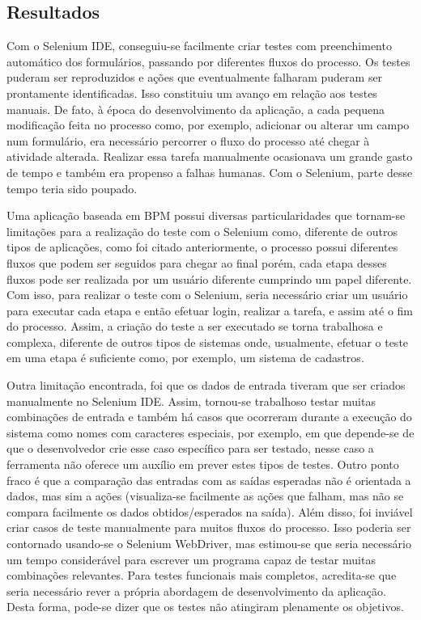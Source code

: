 \documentclass[12pt]{article}
\begin{document}
\subsection{Resultados}

Com o Selenium IDE, conseguiu-se facilmente criar testes com preenchimento automático dos formulários, passando por diferentes fluxos do processo. Os testes puderam ser reproduzidos e ações que eventualmente falharam puderam ser prontamente identificadas. Isso constituiu um avanço em relação aos testes manuais. De fato, à época do desenvolvimento da aplicação, a cada pequena modificação feita no processo como, por exemplo, adicionar ou alterar um campo num formulário, era necessário percorrer o fluxo do processo até chegar à atividade alterada. Realizar essa tarefa manualmente ocasionava um grande gasto de tempo e também era propenso a falhas humanas. Com o Selenium, parte desse tempo teria sido poupado.

Uma aplicação baseada em BPM possui diversas particularidades que tornam-se limitações para a realização do teste com o Selenium como, diferente de outros tipos de aplicações, como foi citado anteriormente, o processo possui diferentes fluxos que podem ser seguidos para chegar ao final porém, cada etapa desses fluxos pode ser realizada por um usuário diferente cumprindo um papel diferente. Com isso, para realizar o teste com o Selenium, seria necessário criar um usuário para executar cada etapa e então efetuar login, realizar a tarefa, e assim até o fim do processo. Assim, a criação do teste a ser executado se torna trabalhosa e complexa, diferente de outros tipos de sistemas onde, usualmente, efetuar o teste em uma etapa é suficiente como, por exemplo, um sistema de cadastros.

Outra limitação encontrada, foi que os dados de entrada tiveram que ser criados manualmente no Selenium IDE. Assim, tornou-se trabalhoso testar muitas combinações de entrada e também há casos que ocorreram durante a execução do sistema como nomes com caracteres especiais, por exemplo, em que depende-se de que o desenvolvedor crie esse caso específico para ser testado, nesse caso a ferramenta não oferece um auxílio em prever estes tipos de testes. Outro ponto fraco é que a comparação das entradas com as saídas esperadas não é orientada a dados, mas sim a ações (visualiza-se facilmente as ações que falham, mas não se compara facilmente os dados obtidos/esperados na saída). Além disso, foi inviável criar casos de teste manualmente para muitos fluxos do processo. Isso poderia ser contornado usando-se o Selenium WebDriver, mas estimou-se que seria necessário um tempo considerável para escrever um programa capaz de testar muitas combinações relevantes. Para testes funcionais mais completos, acredita-se que seria necessário rever a própria abordagem de desenvolvimento da aplicação. Desta forma, pode-se dizer que os testes não atingiram plenamente os objetivos.
\end{document}
